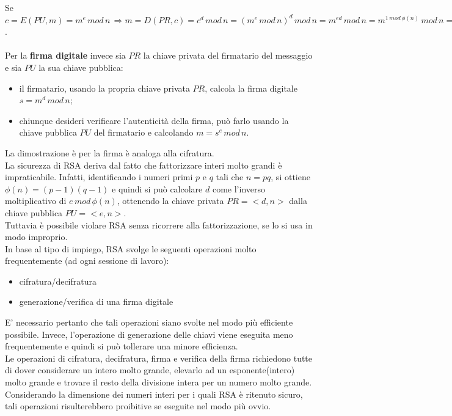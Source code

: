 Se $c=E(PU,m) = m^e \, mod \, n \, \Rightarrow m=D(PR,c) = c^d \, mod \, n = (m^e \, mod \, n)^d \, mod \, n = m^{ed} \, mod \, n = m^{1 \, mod \, \phi(n)} \, mod \, n = m \, mod \, n = m$. \\ \\
Per la \textbf{firma digitale} invece sia $PR$ la chiave privata del firmatario del messaggio e sia $PU$ la sua chiave pubblica: \begin{itemize}
\item il firmatario, usando la propria chiave privata $PR$, calcola la firma digitale $s = m^d \, mod \, n$;
\item chiunque desideri verificare l'autenticità della firma, può farlo usando la chiave pubblica $PU$ del firmatario e calcolando $m = s^e \, mod \, n$.
\end{itemize}
La dimostrazione è per la firma è analoga alla cifratura. \\

La sicurezza di RSA deriva dal fatto che fattorizzare interi molto grandi è impraticabile. Infatti, identificando i numeri primi $p$ e $q$ tali che $n = pq$, si ottiene $\phi(n) = (p-1)(q-1)$ e quindi si può calcolare $d$ come l'inverso moltiplicativo di $e \, mod \, \phi(n)$, ottenendo la chiave privata $PR = <d,n>$ dalla chiave pubblica $PU = <e,n>$. \\ 
Tuttavia è possibile violare RSA senza ricorrere alla fattorizzazione, se lo si usa in modo improprio. \\
In base al tipo di impiego, RSA svolge le seguenti operazioni molto frequentemente (ad ogni sessione di lavoro): \begin{itemize}
\item cifratura/decifratura
\item generazione/verifica di una firma digitale
\end{itemize}
E' necessario pertanto che tali operazioni siano svolte nel modo più efficiente possibile. Invece, l'operazione di generazione delle chiavi viene eseguita meno frequentemente e quindi si può tollerare una minore efficienza.\\
Le operazioni di cifratura, decifratura, firma e verifica della firma richiedono tutte di dover considerare un intero molto grande, elevarlo ad un esponente(intero) molto grande e trovare il resto della divisione intera per un numero molto grande. Considerando la dimensione dei numeri interi per i quali RSA è ritenuto sicuro, tali operazioni
risulterebbero proibitive se eseguite nel modo più ovvio. \\
